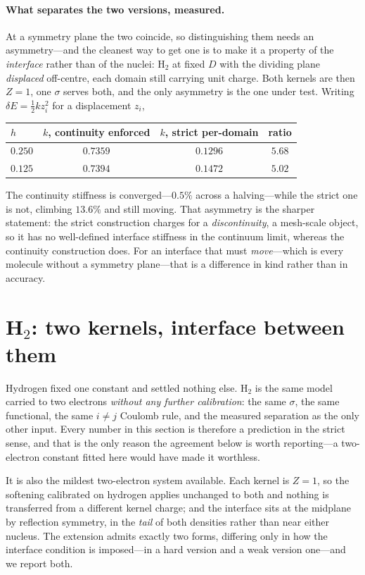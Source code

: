 \documentclass[11pt,a4paper]{article}
\begin{document}
\paragraph{What separates the two versions, measured.} At a symmetry plane the two coincide, so
distinguishing them needs an asymmetry---and the cleanest way to get one is to make it a property of
the \emph{interface} rather than of the nuclei: H$_2$ at fixed $D$ with the dividing plane
\emph{displaced} off-centre, each domain still carrying unit charge. Both kernels are then $Z = 1$,
one $\sigma$ serves both, and the only asymmetry is the one under test. Writing $\delta E = \tfrac12 k z_i^2$ for a displacement $z_i$,
\begin{center}
\begin{tabular}{lccc}
\toprule
$h$ & $k$, continuity enforced & $k$, strict per-domain & ratio \\
\midrule
$0.250$ & $0.7359$ & $0.1296$ & $5.68$ \\
$0.125$ & $0.7394$ & $0.1472$ & $5.02$ \\
\bottomrule
\end{tabular}
\end{center}
The continuity stiffness is converged---$0.5\%$ across a halving---while the strict one is not,
climbing $13.6\%$ and still moving. That asymmetry is the sharper statement: the strict construction
charges for a \emph{discontinuity}, a mesh-scale object, so it has no well-defined interface
stiffness in the continuum limit, whereas the continuity construction does. For an interface that
must \emph{move}---which is every molecule without a symmetry plane---that is a difference in kind
rather than in accuracy.

\section{H$_2$: two kernels, interface between them}

Hydrogen fixed one constant and settled nothing else. H$_2$ is the same model carried to two
electrons \emph{without any further calibration}: the same $\sigma$, the same functional, the same
$i \neq j$ Coulomb rule, and the measured separation as the only other input. Every number in this
section is therefore a prediction in the strict sense, and that is the only reason the agreement
below is worth reporting---a two-electron constant fitted here would have made it worthless.

It is also the mildest two-electron system available. Each kernel is $Z = 1$, so the softening
calibrated on hydrogen applies unchanged to both and nothing is transferred from a different kernel
charge; and the interface sits at the midplane by reflection symmetry, in the \emph{tail} of both
densities rather than near either nucleus. The extension admits exactly two forms, differing only in
how the interface condition is imposed---in a hard version and a weak version
one---and we report both.
\end{document}
